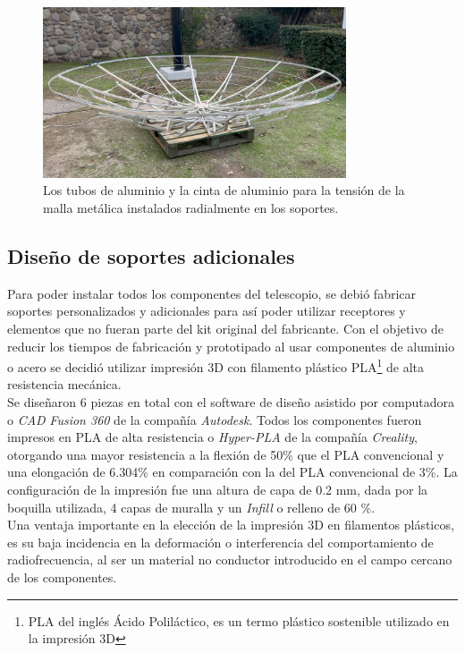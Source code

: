 \begin{figure}
    \centering
    \includegraphics[width=0.8\textwidth]{img/estructura2}
    \caption{Los tubos de aluminio y la cinta de aluminio para la tensión de la malla metálica instalados radialmente en los soportes.}
    \label{fig:ensamble3}
\end{figure}

\subsection{Diseño de soportes adicionales}

Para poder instalar todos los componentes del telescopio, se debió fabricar soportes personalizados y adicionales para así poder utilizar receptores y elementos que no fueran parte del kit original del fabricante. Con el objetivo de reducir los tiempos de fabricación y prototipado al usar componentes de aluminio o acero se decidió utilizar impresión 3D con filamento plástico PLA\footnote{PLA del inglés Ácido Poliláctico, es un termo plástico sostenible utilizado en la impresión 3D} de alta resistencia mecánica.\\

Se diseñaron 6 piezas en total con el software de diseño asistido por computadora o \textit{CAD} \textit{Fusion 360} de la compañía \textit{Autodesk}. Todos los componentes fueron impresos en PLA de alta resistencia o \textit{Hyper-PLA} de la compañía \textit{Creality}, otorgando una mayor resistencia a la flexión de 50\% que el PLA convencional y una elongación de 6.304\% en comparación con la del PLA convencional de 3\%. La configuración de la impresión fue una altura de capa de 0.2 mm, dada por la boquilla utilizada, 4 capas de muralla y un \textit{Infill} o relleno de 60 \%.\\

Una ventaja importante en la elección de la impresión 3D en filamentos plásticos, es su baja incidencia en la deformación o interferencia del comportamiento de radiofrecuencia, al ser un material no conductor introducido en el campo cercano de los componentes.\\

